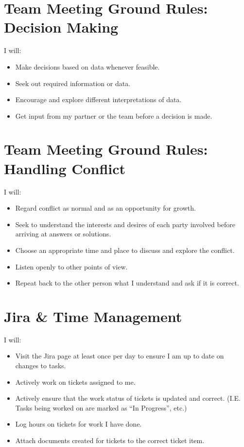 \begin{appendices}
\section{Team Meeting Ground Rules: Decision Making}
I will:
\begin{itemize}
    \item Make decisions based on data whenever feasible.
    \item Seek out required information or data.
    \item Encourage and explore different interpretations of data.
    \item Get input from my partner or the team before a decision is made.
\end{itemize}

\section{Team Meeting Ground Rules: Handling Conflict}
I will:
\begin{itemize}
    \item Regard conflict as normal and as an opportunity for growth.
    \item Seek to understand the interests and desires of each party involved before arriving at answers or solutions.
    \item Choose an appropriate time and place to discuss and explore the conflict.
    \item Listen openly to other points of view.
    \item Repeat back to the other person what I understand and ask if it is correct.
\end{itemize}

\section{Jira \& Time Management}
I will:
\begin{itemize}
    \item Visit the Jira page at least once per day to ensure I am up to date on changes to tasks.
    \item Actively work on tickets assigned to me.
    \item Actively ensure that the work status of tickets is updated and correct. (I.E. Tasks being worked on are marked as “In Progress”, etc.)
    \item Log hours on tickets for work I have done.
    \item Attach documents created for tickets to the correct ticket item.
\end{itemize}


\end{appendices}
